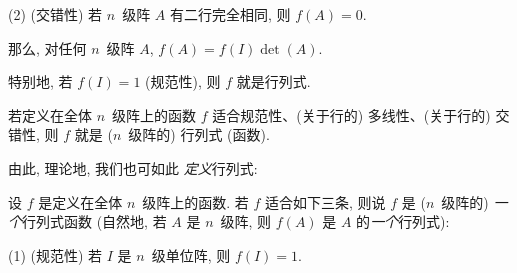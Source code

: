 \begin{theorem}
    (2)
    (交错性)
    若 \(n\)~级阵 \(A\) 有二行完全相同,
    则 \(f {(A)} = 0\).

    那么, 对任何 \(n\)~级阵 \(A\),
    \(f(A) = f(I) \det {(A)}\).

    特别地, 若 \(f(I) = 1\) (规范性),
    则 \(f\) 就是行列式.
\end{theorem}

\begin{theorem}
    若定义在全体 \(n\)~级阵上的函数 \(f\)
    适合规范性、(关于行的) 多线性、(关于行的) 交错性,
    则 \(f\) 就是 (\(n\)~级阵的) 行列式 (函数).
\end{theorem}

由此, 理论地, 我们也可如此%
\emph{定义}行列式:

\begin{definition}
    设 \(f\) 是定义在全体 \(n\)~级阵上的函数.
    若 \(f\) 适合如下三条, 则说
    \(f\) 是 (\(n\)~级阵的) \emph{一个}行列式函数
    (自然地, 若 \(A\) 是 \(n\)~级阵,
    则 \(f(A)\) 是 \(A\) 的\emph{一个}行列式):

    (1)
    (规范性)
    若 \(I\) 是 \(n\)~级单位阵,
    则 \(f(I) = 1\).


\end{definition}
